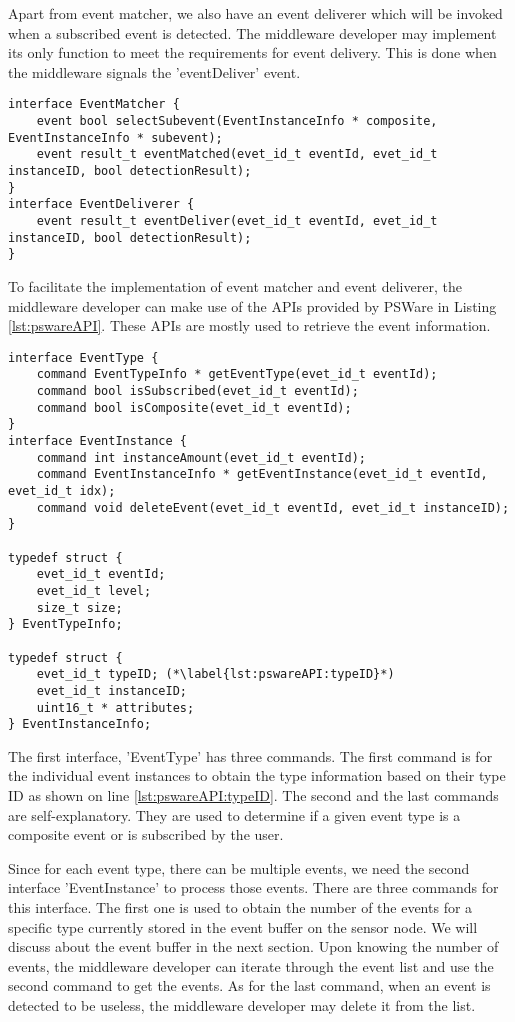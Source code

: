 Apart from event matcher, we also have an event deliverer which will be invoked when a subscribed event is detected. The middleware developer may implement its only function to meet the requirements for event delivery. This is done when the middleware signals the 'eventDeliver' event.
\begin{lstlisting}[caption=The event matcher interface, label=lst:pswareEventMatcher]
interface EventMatcher {
	event bool selectSubevent(EventInstanceInfo * composite, EventInstanceInfo * subevent);
	event result_t eventMatched(evet_id_t eventId, evet_id_t instanceID, bool detectionResult);
}
interface EventDeliverer {
	event result_t eventDeliver(evet_id_t eventId, evet_id_t instanceID, bool detectionResult);
}
\end{lstlisting}

To facilitate the implementation of event matcher and event deliverer, the middleware developer can make use of the APIs provided by PSWare in Listing \ref{lst:pswareAPI}. These APIs are mostly used to retrieve the event information.
\begin{lstlisting}[caption=PSWare API in NesC, label=lst:pswareAPI]
interface EventType {
	command EventTypeInfo * getEventType(evet_id_t eventId);
	command bool isSubscribed(evet_id_t eventId);
	command bool isComposite(evet_id_t eventId);
}
interface EventInstance {
	command int instanceAmount(evet_id_t eventId);
	command EventInstanceInfo * getEventInstance(evet_id_t eventId, evet_id_t idx);
	command void deleteEvent(evet_id_t eventId, evet_id_t instanceID);
}

typedef struct {
	evet_id_t eventId;
	evet_id_t level;
	size_t size;
} EventTypeInfo;

typedef struct {
	evet_id_t typeID; (*\label{lst:pswareAPI:typeID}*)
	evet_id_t instanceID;
	uint16_t * attributes;
} EventInstanceInfo;
\end{lstlisting}

The first interface, 'EventType' has three commands. The first command is for the individual event instances to obtain the type information based on their type ID as shown on line \ref{lst:pswareAPI:typeID}. The second and the last commands are self-explanatory. They are used to determine if a given event type is a composite event or is subscribed by the user.

Since for each event type, there can be multiple events, we need the second interface 'EventInstance' to process those events. There are three commands for this interface. The first one is used to obtain the number of the events for a specific type currently stored in the event buffer on the sensor node. We will discuss about the event buffer in the next section. Upon knowing the number of events, the middleware developer can iterate through the event list and use the second command to get the events. As for the last command, when an event is detected to be useless, the middleware developer may delete it from the list.

